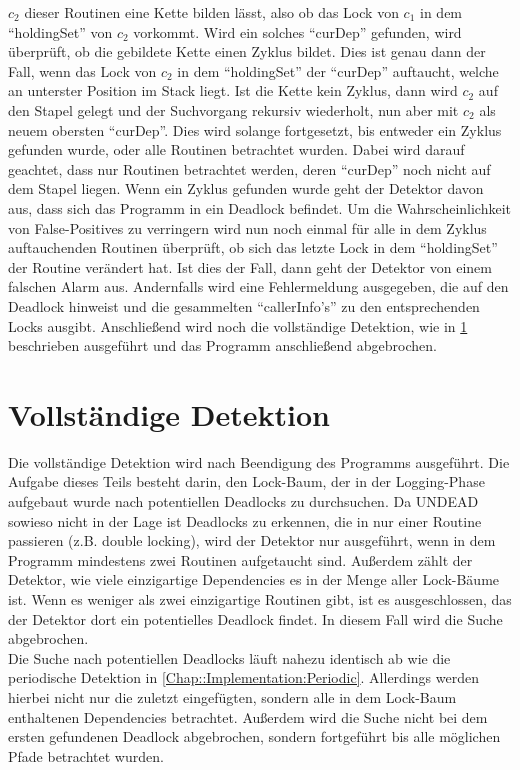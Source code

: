  $c_2$ dieser 
Routinen eine Kette bilden lässt, also ob das Lock von $c_1$ in dem 
``holdingSet'' von $c_2$ vorkommt. Wird ein solches 
``curDep'' gefunden, wird überprüft, ob die gebildete Kette einen Zyklus bildet.
Dies ist genau dann der Fall, wenn das Lock von $c_2$ in dem ``holdingSet''
der ``curDep'' auftaucht, welche an unterster Position im Stack liegt. Ist 
die Kette kein Zyklus, dann wird $c_2$ auf den Stapel gelegt und der Suchvorgang
rekursiv wiederholt, nun aber mit $c_2$ als neuem obersten ``curDep''. Dies wird
solange fortgesetzt, bis entweder ein Zyklus gefunden wurde, oder alle Routinen 
betrachtet wurden. Dabei wird darauf geachtet, dass nur Routinen betrachtet 
werden, deren ``curDep'' noch nicht auf dem Stapel liegen. Wenn ein Zyklus 
gefunden wurde geht der Detektor davon aus, dass sich das Programm in ein
Deadlock befindet. Um die Wahrscheinlichkeit von False-Positives zu verringern
wird nun noch einmal für alle in dem Zyklus auftauchenden Routinen überprüft,
ob sich das letzte Lock in dem ``holdingSet'' der Routine verändert hat. Ist dies 
der Fall, dann geht der Detektor von einem falschen Alarm aus. Andernfalls 
wird eine Fehlermeldung ausgegeben, die auf den Deadlock hinweist und die 
gesammelten ``callerInfo's'' zu den entsprechenden Locks ausgibt. Anschließend
wird noch die vollständige Detektion, wie in \ref{Chap::Implementation:Complete}
beschrieben ausgeführt und das Programm anschließend abgebrochen. 


\section{Vollständige Detektion} \label{Chap::Implementation:Complete}
Die vollständige Detektion wird nach Beendigung des Programms ausgeführt. 
Die Aufgabe dieses Teils besteht darin, den Lock-Baum, der in der Logging-Phase 
aufgebaut wurde nach potentiellen Deadlocks zu durchsuchen. Da UNDEAD 
sowieso nicht in
der Lage ist Deadlocks zu erkennen, die in nur einer Routine passieren (z.B. 
double locking), wird der Detektor nur ausgeführt, wenn in dem Programm 
mindestens zwei Routinen aufgetaucht sind. Außerdem zählt der Detektor, wie 
viele einzigartige Dependencies es in der Menge aller Lock-Bäume ist. Wenn es 
weniger als zwei einzigartige Routinen gibt, ist es ausgeschlossen, das 
der Detektor dort ein potentielles Deadlock findet. In diesem Fall wird die 
Suche abgebrochen.\\
Die Suche nach potentiellen Deadlocks läuft nahezu identisch ab wie die 
periodische Detektion
in \ref{Chap::Implementation:Periodic}. Allerdings werden hierbei nicht nur 
die zuletzt eingefügten, sondern alle in dem Lock-Baum enthaltenen Dependencies
betrachtet. Außerdem wird die Suche nicht bei dem ersten gefundenen Deadlock 
abgebrochen, sondern fortgeführt bis alle möglichen Pfade betrachtet wurden.


